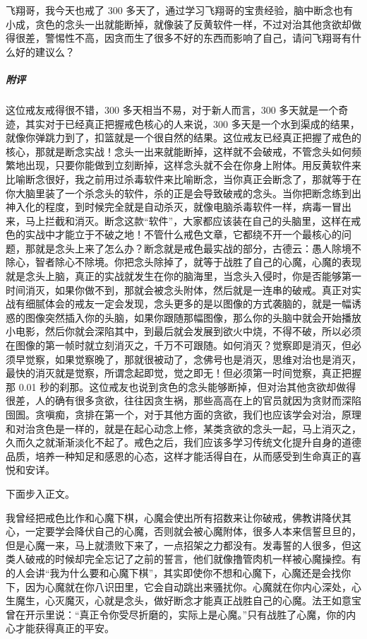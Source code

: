 \begin{case}
    飞翔哥，我今天也戒了 300 多天了，通过学习飞翔哥的宝贵经验，脑中断念也有小成，贪色的念头一出就能断掉，就像装了反黄软件一样，不过对治其他贪欲却做得很差，警惕性不高，因贪而生了很多不好的东西而影响了自己，请问飞翔哥有什么好的建议么？
    \subparagraph{附评} 这位戒友戒得很不错，300 多天相当不易，对于新人而言，300 多天就是一个奇迹，其实对于已经真正把握戒色核心的人来说，300 多天是一个水到渠成的结果，就像你弹跳力到了，扣篮就是一个很自然的结果。这位戒友已经真正把握了戒色的核心，那就是断念实战！念头一出来就能断掉，这样就不会破戒，不管念头如何频繁地出现，只要你能做到立刻断掉，这样念头就不会在你身上附体。用反黄软件来比喻断念很好，我之前用过杀毒软件来比喻断念，当你真正会断念了，那就等于在你大脑里装了一个杀念头的软件，杀的正是会导致破戒的念头。当你把断念练到出神入化的程度，到时候完全就是自动杀灭，就像电脑杀毒软件一样，病毒一冒出来，马上拦截和消灭。断念这款“软件”，大家都应该装在自己的头脑里，这样在戒色的实战中才能立于不破之地！不管什么戒色文章，它都绕不开一个最核心的问题，那就是念头上来了怎么办？断念就是戒色最实战的部分，古德云：愚人除境不除心，智者除心不除境。你把念头除掉了，就等于战胜了自己的心魔，心魔的表现就是念头上脑，真正的实战就发生在你的脑海里，当念头入侵时，你是否能够第一时间消灭，如果你做不到，那就会被念头附体，然后就是一连串的破戒。真正对实战有细腻体会的戒友一定会发现，念头更多的是以图像的方式袭脑的，就是一幅诱惑的图像突然插入你的头脑，如果你跟随那幅图像，那么你的头脑中就会开始播放小电影，然后你就会深陷其中，到最后就会发展到欲火中烧，不得不破，所以必须在图像的第一帧时就立刻消灭之，千万不可跟随。如何消灭？觉察即是消灭，但必须早觉察，如果觉察晚了，那就很被动了，念佛号也是消灭，思维对治也是消灭，最快的消灭就是觉察，所谓念起即觉，觉之即无！但必须第一时间觉察，真正把握那 0.01 秒的刹那。这位戒友也说到贪色的念头能够断掉，但对治其他贪欲却做得很差，人的确有很多贪欲，往往因贪生祸，那些高高在上的官员就因为贪财而深陷囹圄。贪嗔痴，贪排在第一个，对于其他方面的贪欲，我们也应该学会对治，原理和对治贪色是一样的，就是在起心动念上修，某类贪欲的念头一起，马上消灭之，久而久之就渐渐淡化不起了。戒色之后，我们应该多学习传统文化提升自身的道德品质，培养一种知足和感恩的心态，这样才能活得自在，从而感受到生命真正的喜悦和安详。
\end{case}

下面步入正文。

我曾经把戒色比作和心魔下棋，心魔会使出所有招数来让你破戒，佛教讲降伏其心，一定要学会降伏自己的心魔，否则就会被心魔附体，很多人本来信誓旦旦的，但是心魔一来，马上就溃败下来了，一点招架之力都没有。发毒誓的人很多，但这类人破戒的时候却完全忘记了之前的誓言，他们就像撸管肉机一样被心魔操控。有的人会讲“我为什么要和心魔下棋”，其实即使你不想和心魔下，心魔还是会找你下，因为心魔就在你八识田里，它会自动跳出来骚扰你。心魔就在你内心深处，心生魔生，心灭魔灭，心就是念头，做好断念才能真正战胜自己的心魔。法王如意宝曾在开示里说：“真正令你受尽折磨的，实际上是心魔。”只有战胜了心魔，你的内心才能获得真正的平安。


